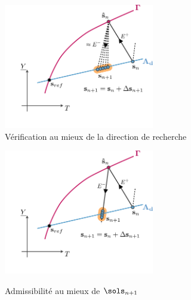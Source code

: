  \begin{figure}[!h]
\begin{center}
\begin{minipage}{5.7cm}
\begin{center}
\includegraphics[height=5.45cm]{LATIN.figure/rech_au_mieux}\\
\caption{Vérification au mieux de la direction de recherche\label{rech_au_mieux}}
\end{center}
\end{minipage}%
\hspace{0.8cm}
\begin{minipage}{5.7cm}
\begin{center}
\includegraphics[height=5.45cm]{LATIN.figure/ad_au_mieux}\\
\caption{Admissibilité au mieux de $\sols_{n+1}$\label{ad_au_mieux}}
\end{center}
\end{minipage}
\end{center}
\end{figure}
 
 


